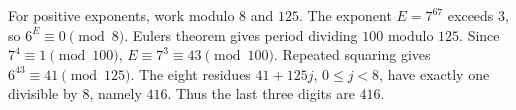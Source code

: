 For positive exponents, work modulo $8$ and $125$. The exponent $E=7^{67}$ exceeds $3$, so $6^E\equiv0\pmod8$. Euler\textquotesingle s theorem gives period dividing $100$ modulo $125$. Since $7^4\equiv1\pmod{100}$, $E\equiv7^3\equiv43\pmod{100}$. Repeated squaring gives $6^{43}\equiv41\pmod{125}$. The eight residues $41+125j$, $0\le j<8$, have exactly one divisible by $8$, namely $416$. Thus the last three digits are $\boxed{416}$.
